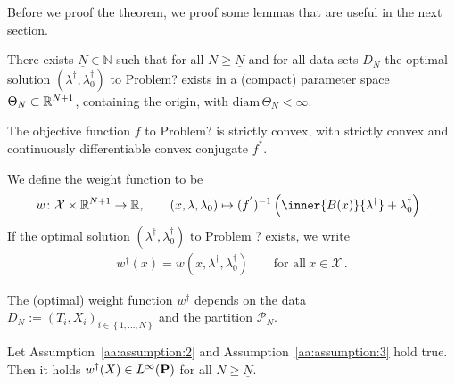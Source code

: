 Before we proof the theorem, we proof some lemmas that are useful in the next section.


\begin{assumption}
  \label{aa:assumption:2}
  There exists $\underline{N}\in\mathbb{N}$ such that 
  for all $N\ge \underline{N}$ and for all data sets $D_N$
  the optimal solution
  $(\lambda^\dagger,\lambda_0^\dagger)$
  to Problem? exists in a (compact) parameter space 
  $\Theta_N\subset \R^{N+1}$, containing the origin, with
  $\mathrm{diam}\,\Theta_N<\infty$.
\end{assumption}

\begin{assumption}
  \label{aa:assumption:3}
  The objective function $f$ to Problem? is strictly convex, with strictly convex and continuously differentiable convex conjugate $f^*$. 
\end{assumption}
\begin{definition}
  \label{def:weights_function}
  We define the weight function to be
\begin{gather*}
  w
  \colon
  \mathcal{X}
  \times
  \R^{N+1}
  \to
  \R
  ,\qquad
  \left( 
  x
  ,
  \lambda
  ,
  \lambda_0
  \right)
  \mapsto
    (
    f^{'}
    )^{-1}
    \left( 
      \inner{B(x)}{\lambda^\dagger}
      +
      \lambda_0^\dagger
    \right)
    \,.
\end{gather*}
If 
  the optimal solution
  $(\lambda^\dagger,\lambda_0^\dagger)$
  to Problem ? exists, we write
  \begin{gather*}
    w^\dagger(x)
    =
    w(x,\lambda^\dagger,\lambda^\dagger_0)
    \qquad
    \text{for all}\ 
    x\in\mathcal{X}\,.
  \end{gather*}
\end{definition}
\begin{remark}
  The (optimal) weight function $w^\dagger$ depends on the data
  $D_N:=
  (T_i,X_i)_{i\in \left\{ 1,\ldots,N \right\}}$
  and the partition $\mathcal{P}_N$.
\end{remark}
\begin{lemma}
  \label{weights_bounded}
  Let Assumption~\ref{aa:assumption:2} and Assumption~\ref{aa:assumption:3} hold true.
  Then it holds 
  $
  w^\dagger(X)\in L^\infty(\P)
  $ for all $N\ge \underline{N}$.
\end{lemma}
